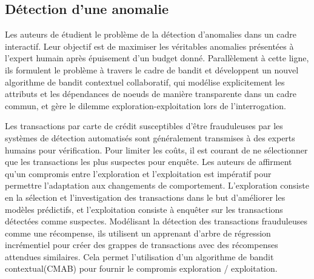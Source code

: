 \documentclass[conference]{IEEEtran}
\newcommand{\1}[1]{\mathbbm{1}_{\left\{#1\right\}}}
\begin{document}
\subsection{Détection d'une anomalie}
Les auteurs de \cite{Ding:2019} étudient le problème de la détection d'anomalies dans un cadre interactif. Leur objectif est de maximiser les véritables anomalies présentées à l'expert humain après épuisement d'un budget donné. Parallèlement à cette ligne, ils formulent le problème à travers le cadre de bandit et développent un nouvel algorithme de bandit contextuel collaboratif, qui modélise explicitement les attributs et les dépendances de noeuds de manière transparente dans un cadre commun, et gère le dilemme exploration-exploitation lors de l'interrogation. 

Les transactions par carte de crédit susceptibles d'être frauduleuses par les systèmes de détection automatisés sont généralement transmises à des experts humains pour vérification. Pour limiter les coûts, il est courant de ne sélectionner que les transactions les plus suspectes pour enquête. Les auteurs de \cite{soemers2018adapting} affirment qu'un compromis entre l'exploration et l'exploitation est impératif pour permettre l'adaptation aux changements de comportement. L'exploration consiste en la sélection et l'investigation des transactions dans le but d'améliorer les modèles prédictifs, et l'exploitation consiste à enquêter sur les transactions détectées comme suspectes. Modélisant la détection des transactions frauduleuses comme une récompense, ils utilisent un apprenant d'arbre de régression incrémentiel pour créer des grappes de transactions avec des récompenses attendues similaires. Cela permet l'utilisation d'un algorithme de bandit contextual(CMAB) pour fournir le compromis exploration / exploitation.
\end{document}
